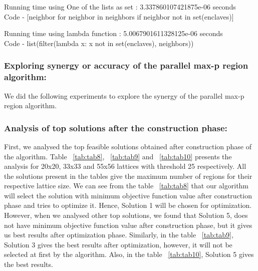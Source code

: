 \documentclass[conference]{IEEEtran}
\begin{document}
Running time using One of the lists as set : 3.337860107421875e-06 seconds\\
Code - [neighbor for neighbor in neighbors if neighbor not in set(enclaves)]

Running time using lambda function : 5.0067901611328125e-06 seconds\\
Code - list(filter(lambda x: x not in set(enclaves), neighbors))

\subsubsection{Exploring synergy or accuracy of the parallel max-p region algorithm:}

We did the following experiments to explore the synergy of the parallel max-p region algorithm. 

\subsubsection*{Analysis of top solutions after the construction phase:}
First, we analysed the top feasible solutions obtained after construction phase of the algorithm. Table ~\ref{tab:tab8}, ~\ref{tab:tab9} and ~\ref{tab:tab10} presents the analysis for 20x20, 33x33 and 55x56 lattices with threshold 25 respectively. All the solutions present in the tables give the maximum number of regions for their respective lattice size. We can see from the table ~\ref{tab:tab8} that our algorithm will select the solution with minimum objective function value after construction phase and tries to optimize it. Hence, Solution 1 will be chosen for optimization. However, when we analysed other top solutions, we found that Solution 5, does not have minimum objective function value after construction phase, but it gives us best results after optimization phase. Similarly, in the table ~\ref{tab:tab9}, Solution 3 gives the best results after optimization, however, it will not be selected at first by the algorithm. Also, in the table ~\ref{tab:tab10}, Solution 5 gives the best results.
\end{document}
